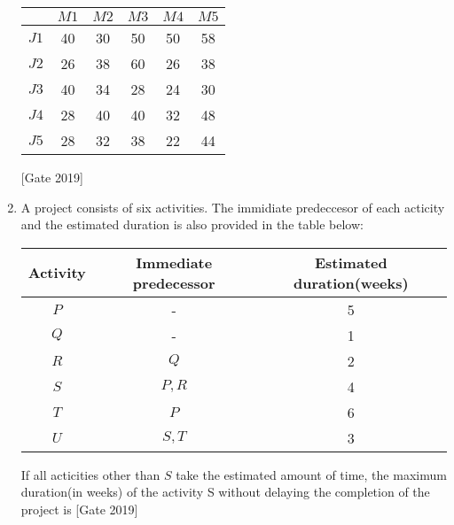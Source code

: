 \documentclass[journal]{IEEEtran}
\begin{document}
\begin{enumerate}
		\begin{table}[h]
		\centering
	\begin{tabular}{|c|c|c|c|c|c|}
	\hline
	&$M1$&$M2$&$M3$&$M4$&$M5$\\
	\hline
	$J1$&40&30&50&50&58\\
	\hline
	$J2$&26&38&60&26&38\\
	\hline
	$J3$&40&34&28&24&30\\
	\hline
	$J4$&28&40&40&32&48\\
	\hline
	$J5$&28&32&38&22&44\\
	\hline
	\end{tabular}
	\end{table}\hfill{[Gate 2019]}
	\item A project consists of six activities. The immidiate predeccesor of each acticity and the estimated duration is also provided in the table below:\\
		\begin{table}[h]
			\centering
	\begin{tabular}{|c|c|c|}
	\hline
		Activity&Immediate predecessor&Estimated duration(weeks)\\
		\hline
		$P$&-&5\\
		\hline
		$Q$&-&1\\
		\hline
		$R$&$Q$&2\\
		\hline
		$S$&$P,R$&4\\
		\hline
		$T$&$P$&6\\
		\hline
		$U$&$S,T$&3\\
		\hline
	\end{tabular}
		\end{table}
	If all acticities other than $S$ take the estimated amount of time, the maximum duration(in weeks) of the activity S without delaying the completion of the project is \underline{\hspace{2cm}}\hfill{[Gate 2019]}



\end{enumerate}
\end{document}
